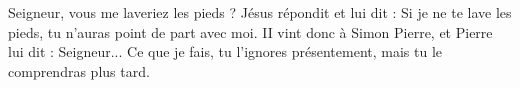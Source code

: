 Seigneur, vous me laveriez les pieds ? Jésus répondit et lui dit : Si je ne te lave les pieds, tu n’auras point de part avec moi.
\versseparator
II vint donc à Simon Pierre, et Pierre lui dit : Seigneur...
\versseparator
Ce que je fais, tu l’ignores présentement, mais tu le comprendras plus tard.